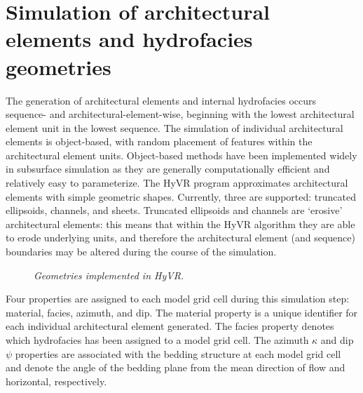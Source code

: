 \documentclass[letterpaper,10pt,english]{sphinxmanual}
\begin{document}
\section{Simulation of architectural elements and hydrofacies geometries}
\label{methods:simulation-of-architectural-elements-and-hydrofacies-geometries}
The generation of architectural elements and internal hydrofacies occurs sequence- and architectural-element-wise, beginning with the lowest architectural element unit in the lowest sequence. The simulation of individual architectural elements is object-based, with random placement of features within the architectural element units. Object-based methods have been implemented widely in subsurface simulation \label{methods:id2}{\hyperref[references:jussel1994]{\sphinxcrossref{{[}JSD94{]}}}}\label{methods:id3}{\hyperref[references:bennett2017]{\sphinxcrossref{{[}BHC17{]}}}} as they are generally computationally efficient and relatively easy to parameterize. The HyVR program approximates architectural elements with simple geometric shapes. Currently, three {\hyperref[methods:shapes]{}} are supported: truncated ellipsoids, channels, and sheets. Truncated ellipsoids and channels are `erosive' architectural elements: this means that within the HyVR algorithm they are able to erode underlying units, and therefore the architectural element (and sequence) boundaries may be altered during the course of the simulation.
\begin{figure}[htbp]
\centering
\capstart

\noindent{}
\caption{\emph{Geometries implemented in HyVR.}}\label{methods:shapes}\label{methods:id11}\end{figure}

Four properties are assigned to each model grid cell during this simulation step: material, facies, azimuth, and dip. The material property is a unique identifier for each individual architectural element generated. The facies property denotes which hydrofacies has been assigned to a model grid cell. The azimuth \(\kappa\) and dip \(\psi\) properties are associated with the bedding structure at each model grid cell and denote the angle of the bedding plane from the mean direction of flow and horizontal, respectively.
\end{document}
